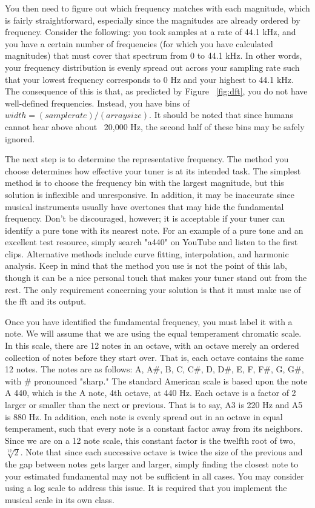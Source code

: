 You then need to figure out which frequency matches with each magnitude, which is fairly straightforward, especially since the magnitudes are already ordered by frequency.
Consider the following: you took samples at a rate of 44.1 kHz, and you have a certain number of frequencies (for which you have calculated magnitudes) that must cover that spectrum from 0 to 44.1 kHz.
In other words, your frequency distribution is evenly spread out across your sampling rate such that your lowest frequency corresponds to 0 Hz and your highest to 44.1 kHz.
The consequence of this is that, as predicted by Figure ~\ref{fig:dft}, you do not have well-defined frequencies.
Instead, you have bins of $width=(sample rate)/(array size)$.
It should be noted that since humans cannot hear above about ~20,000 Hz, the second half of these bins may be safely ignored.

The next step is to determine the representative frequency. 
The method you choose determines how effective your tuner is at its intended task.
The simplest method is to choose the frequency bin with the largest magnitude, but this solution is inflexible and unresponsive.
In addition, it may be inaccurate since musical instruments usually have overtones that may hide the fundamental frequency.
Don't be discouraged, however; it is acceptable if your tuner can identify a pure tone with its nearest note.
For an example of a pure tone and an excellent test resource, simply search "a440" on YouTube and listen to the first clips.
Alternative methods include curve fitting, interpolation, and harmonic analysis.
Keep in mind that the method you use is not the point of this lab, though it can be a nice personal touch that makes your tuner stand out from the rest.
The only requirement concerning your solution is that it must make use of the \ac{fft} and its output.

Once you have identified the fundamental frequency, you must label it with a note.
We will assume that we are using the equal temperament chromatic scale.
In this scale, there are 12 notes in an octave, with an octave merely an ordered collection of notes before they start over.
That is, each octave contains the same 12 notes.
The notes are as follows: A, A\#, B, C, C\#, D, D\#, E, F, F\#, G, G\#, with \# pronounced "sharp."
The standard American scale is based upon the note A 440, which is the A note, 4th octave, at 440 Hz.
Each octave is a factor of 2 larger or smaller than the next or previous.
That is to say, A3 is 220 Hz and A5 is 880 Hz.
In addition, each note is evenly spread out in an octave in equal temperament, such that every note is a constant factor away from its neighbors.
Since we are on a 12 note scale, this constant factor is the twelfth root of two, $ \sqrt[12]{2}$.
Note that since each successive octave is twice the size of the previous and the gap between notes gets larger and larger, simply finding the closest note to your estimated fundamental may not be sufficient in all cases.
You may consider using a log scale to address this issue.
It is required that you implement the musical scale in its own class.

